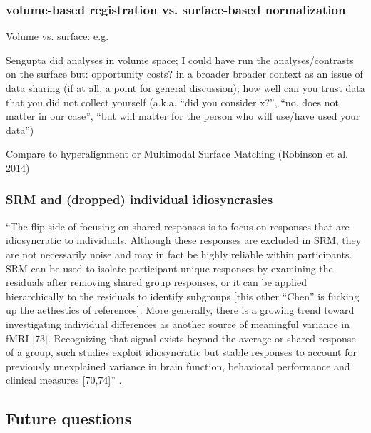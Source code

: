 \subsubsection{volume-based registration vs. surface-based normalization}
%
Volume vs. surface: e.g. \citep{desai2005volumetric}

Sengupta did analyses in volume space;
%
I could have run the analyses/contrasts on the surface
%
but: opportunity costs?
%
in a broader broader context as an issue of data sharing (if at all, a point for
general discussion); how well can you trust data that you did not collect
yourself (a.k.a. ``did you consider x?'', ``no, does not matter in our case'',
``but will matter for the person who will use/have used your data'')

Compare to hyperalignment or Multimodal Surface Matching (Robinson et al. 2014)


\subsubsection{SRM and (dropped) individual idiosyncrasies}

``The flip side of focusing on shared responses is to focus on responses that
are idiosyncratic to individuals.
%
Although these responses are excluded in SRM, they are not necessarily noise and
may in fact be highly reliable within participants.
%
SRM can be used to isolate participant-unique responses by examining the
residuals after removing shared group responses, or it can be applied
hierarchically to the residuals to identify subgroups \citep{chen2017shared}
\citep{cohen2017computational} [this other ``Chen'' is fucking up the aethestics
of references].
%
More generally, there is a growing trend toward investigating individual
differences as another source of meaningful variance in fMRI [73].
%
Recognizing that signal exists beyond the average or shared response of a group,
such studies exploit idiosyncratic but stable responses to account for
previously unexplained variance in brain function, behavioral performance and
clinical measures [70,74]'' \citep{cohen2017computational}.





\subsection{Future questions}


